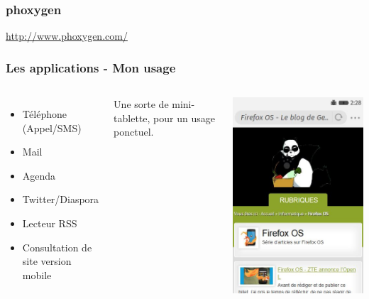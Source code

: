 \documentclass{beamer}
\begin{document}
\begin{frame}
\frametitle{phoxygen}
\url{http://www.phoxygen.com/}
\end{frame}

\begin{frame}
\frametitle{Les applications - Mon usage}
\begin{columns}[c] 
\begin{itemize}
\item Téléphone (Appel/SMS)
\item Mail
\item Agenda
\item Twitter/Diaspora
\item Lecteur RSS
\item Consultation de site version mobile
\end{itemize}
Une sorte de mini-tablette, pour un usage ponctuel.
\begin{center}
\includegraphics[scale=0.6]{./images/site_version_mobile.jpg} 
\end{center}
\end{columns}
\end{frame}
\end{document}
